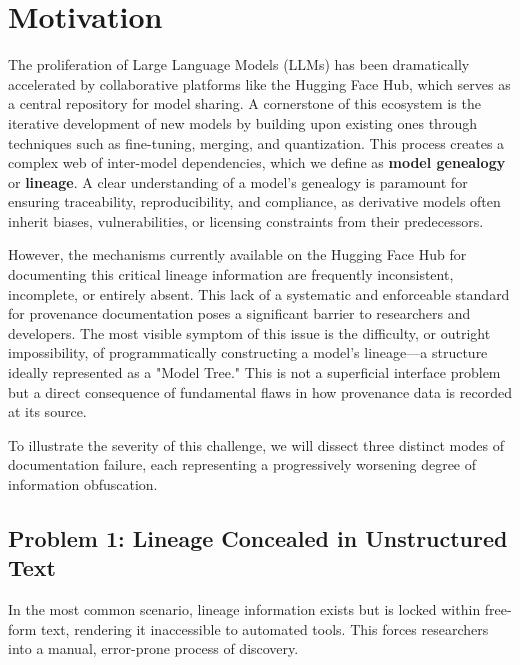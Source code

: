 \section{Motivation}

The proliferation of Large Language Models (LLMs) has been dramatically accelerated by collaborative platforms like the Hugging Face Hub, which serves as a central repository for model sharing. A cornerstone of this ecosystem is the iterative development of new models by building upon existing ones through techniques such as fine-tuning, merging, and quantization. This process creates a complex web of inter-model dependencies, which we define as \textbf{model genealogy} or \textbf{lineage}. A clear understanding of a model's genealogy is paramount for ensuring traceability, reproducibility, and compliance, as derivative models often inherit biases, vulnerabilities, or licensing constraints from their predecessors.

However, the mechanisms currently available on the Hugging Face Hub for documenting this critical lineage information are frequently inconsistent, incomplete, or entirely absent. This lack of a systematic and enforceable standard for provenance documentation poses a significant barrier to researchers and developers. The most visible symptom of this issue is the difficulty, or outright impossibility, of programmatically constructing a model's lineage—a structure ideally represented as a "Model Tree." This is not a superficial interface problem but a direct consequence of fundamental flaws in how provenance data is recorded at its source.

To illustrate the severity of this challenge, we will dissect three distinct modes of documentation failure, each representing a progressively worsening degree of information obfuscation.

\subsection{Problem 1: Lineage Concealed in Unstructured Text}
In the most common scenario, lineage information exists but is locked within free-form text, rendering it inaccessible to automated tools. This forces researchers into a manual, error-prone process of discovery.

